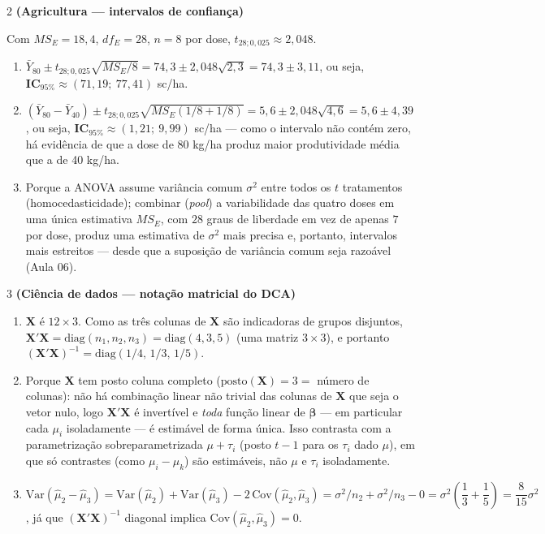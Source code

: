 \documentclass[11pt]{article}
\begin{document}
\begin{questao}{2} \textbf{(Agricultura --- intervalos de confiança)}
\end{questao}
\begin{solucao}
Com $MS_E=18{,}4$, $df_E=28$, $n=8$ por dose, $t_{28;0{,}025}\approx 2{,}048$.
\begin{enumerate}[label=(\alph*)]
  \item $\bar Y_{80} \pm t_{28;0{,}025}\sqrt{MS_E/8} = 74{,}3 \pm 2{,}048\sqrt{2{,}3} = 74{,}3 \pm
    3{,}11$, ou seja, $\textbf{IC}_{95\%} \approx (71{,}19;\ 77{,}41)$ sc/ha.
  \item $(\bar Y_{80}-\bar Y_{40}) \pm t_{28;0{,}025}\sqrt{MS_E(1/8+1/8)} = 5{,}6 \pm
    2{,}048\sqrt{4{,}6} = 5{,}6 \pm 4{,}39$, ou seja, $\textbf{IC}_{95\%}\approx (1{,}21;\ 9{,}99)$
    sc/ha --- como o intervalo não contém zero, há evidência de que a dose de 80 kg/ha produz
    maior produtividade média que a de 40 kg/ha.
  \item Porque a ANOVA assume variância comum $\sigma^2$ entre todos os $t$ tratamentos
    (homocedasticidade); combinar (\emph{pool}) a variabilidade das quatro doses em uma única
    estimativa $MS_E$, com $28$ graus de liberdade em vez de apenas $7$ por dose, produz uma
    estimativa de $\sigma^2$ mais precisa e, portanto, intervalos mais estreitos --- desde que a
    suposição de variância comum seja razoável (Aula 06).
\end{enumerate}
\end{solucao}

\begin{questao}{3} \textbf{(Ciência de dados --- notação matricial do DCA)}
\end{questao}
\begin{solucao}
\begin{enumerate}[label=(\alph*)]
  \item $\mathbf{X}$ é $12\times 3$. Como as três colunas de $\mathbf{X}$ são indicadoras de
    grupos disjuntos, $\mathbf{X}'\mathbf{X} = \mathrm{diag}(n_1,n_2,n_3) =
    \mathrm{diag}(4,3,5)$ (uma matriz $3\times 3$), e portanto
    $(\mathbf{X}'\mathbf{X})^{-1} = \mathrm{diag}(1/4,\,1/3,\,1/5)$.
  \item Porque $\mathbf{X}$ tem posto coluna completo ($\mathrm{posto}(\mathbf{X})=3=$ número de
    colunas): não há combinação linear não trivial das colunas de $\mathbf{X}$ que seja o vetor
    nulo, logo $\mathbf{X}'\mathbf{X}$ é invertível e \emph{toda} função linear de $\boldsymbol\beta$
    --- em particular cada $\mu_i$ isoladamente --- é estimável de forma única. Isso contrasta com
    a parametrização sobreparametrizada $\mu+\tau_i$ (posto $t-1$ para os $\tau_i$ dado $\mu$), em
    que só contrastes (como $\mu_i-\mu_k$) são estimáveis, não $\mu$ e $\tau_i$ isoladamente.
  \item $\mathrm{Var}(\hat\mu_2-\hat\mu_3) = \mathrm{Var}(\hat\mu_2)+\mathrm{Var}(\hat\mu_3)
    -2\,\mathrm{Cov}(\hat\mu_2,\hat\mu_3) = \sigma^2/n_2 + \sigma^2/n_3 - 0 =
    \sigma^2\!\left(\dfrac{1}{3}+\dfrac{1}{5}\right) = \dfrac{8}{15}\sigma^2$, já que
    $(\mathbf{X}'\mathbf{X})^{-1}$ diagonal implica $\mathrm{Cov}(\hat\mu_2,\hat\mu_3)=0$.
\end{enumerate}
\end{solucao}
\end{document}
